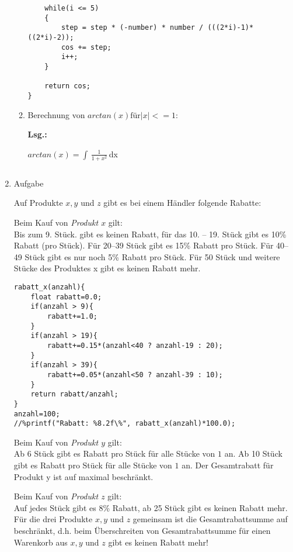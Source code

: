 \documentclass[12pt,a4paper,ngerman]{scrreprt}
\newcommand{\Lsg}{\par \textbf{Lsg.: } \hfill}
\begin{document}
\begin{enumerate}
\begin{enumerate}
\begin{lstlisting}
    while(i <= 5)
    {
        step = step * (-number) * number / (((2*i)-1)*((2*i)-2));
        cos += step;
        i++;
    }

    return cos;
}
\end{lstlisting}

\item Berechnung von $arctan(x) \text{für} |x|<=1$:

\Lsg

%
\begin{comment}
\end{comment}

$arctan(x) = \int\,\frac{1}{1+x^2}$\,dx

\begin{lstlisting}

\end{lstlisting}

\end{enumerate}

\item Aufgabe %

Auf Produkte $x, y$ und $z$ gibt es bei einem Händler folgende Rabatte:
\par Beim Kauf von \textit{Produkt $x$} gilt: \\
Bis zum 9. Stück. gibt es keinen Rabatt, für das 10. -- 19. Stück gibt es 10\% Rabatt (pro Stück).
Für \numrange{20}{39}{ Stück} gibt es \si{15}{\%} Rabatt pro Stück.
Für \numrange{40}{49}{ Stück} gibt es nur noch \si{5}{\%} Rabatt pro Stück.
Für \si{50}{ Stück} und weitere Stücke des Produktes x gibt es keinen Rabatt mehr.

\begin{lstlisting}
rabatt_x(anzahl){
	float rabatt=0.0;
	if(anzahl > 9){
		rabatt+=1.0;
	}
	if(anzahl > 19){
		rabatt+=0.15*(anzahl<40 ? anzahl-19 : 20);
	}
	if(anzahl > 39){
		rabatt+=0.05*(anzahl<50 ? anzahl-39 : 10);
	}
	return rabatt/anzahl;
}
anzahl=100;
//%printf("Rabatt: %8.2f\%", rabatt_x(anzahl)*100.0);
\end{lstlisting}

\par Beim Kauf von \textit{Produkt $y$} gilt: \\
Ab \si{6}{ Stück} gibt es  Rabatt pro Stück für alle Stücke von $1$ an.
Ab \si{10}{ Stück} gibt es  Rabatt pro Stück für alle Stücke von $1$ an.
Der Gesamtrabatt für Produkt y ist auf maximal  beschränkt.
\par Beim Kauf von \textit{Produkt $z$} gilt: \\
Auf jedes Stück gibt es 8\% Rabatt, ab \si{25}{ Stück} gibt es keinen Rabatt mehr.
Für die drei Produkte $x, y$ und $z$ gemeinsam ist die Gesamtrabattsumme auf 
beschränkt, d.h. beim Überschreiten von  Gesamtrabattsumme für einen Warenkorb
aus $x, y$ und $z$ gibt es keinen Rabatt mehr!


\end{enumerate}
\end{document}
